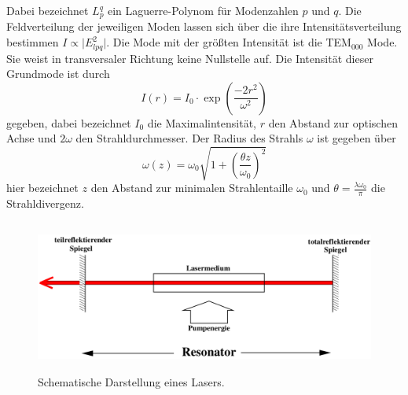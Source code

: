Dabei bezeichnet $L_p ^q$ ein Laguerre-Polynom für Modenzahlen $p$ und $q$. Die Feldverteilung der jeweiligen 
Moden lassen sich über die ihre Intensitätsverteilung bestimmen $I \propto \lvert E_{lpq}^2 \rvert$. Die 
Mode mit der größten Intensität ist die TEM$_{000}$ Mode. Sie weist in transversaler Richtung keine 
Nullstelle auf. Die Intensität dieser Grundmode ist durch 
\begin{equation}
I(r) = I_0  \cdot \exp\left (\frac{-2r^2}{\omega^2} \right )	
\label{eq:IGM}
\end{equation}
gegeben, dabei bezeichnet $I_0$ die Maximalintensität, $r$ den Abstand zur optischen Achse und $2\omega$ den 
Strahldurchmesser. Der Radius des Strahls $\omega$ ist gegeben über 
\begin{equation}
\omega(z) = \omega_0 \sqrt{1+ \left( \frac{\theta z}{\omega_0} \right)^2}
\label{eq:SR}
\end{equation}
hier bezeichnet $z$ den Abstand zur minimalen Strahlentaille $\omega_0$ und 
$\theta = \frac{\lambda \omega_0}{\pi}$ die Strahldivergenz.
 
\begin{figure}
  \centering
  \includegraphics[height = 5cm]{pics/Resonator.png}
  \caption{Schematische Darstellung eines Lasers.}
  \label{fig:sl}
\end{figure}
